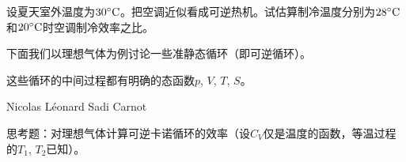 \documentclass[CJK]{beamer}
\begin{document}
\begin{frame}
\bch


设夏天室外温度为$30^\circ \mathrm{C}$。把空调近似看成可逆热机。试估算制冷温度分别为$28^\circ \mathrm{C}$和$20^\circ \mathrm{C}$时空调制冷效率之比。

\ech
\end{frame}

\begin{frame}
\bch
下面我们以理想气体为例讨论一些准静态循环（即可逆循环）。

\skipline

这些循环的中间过程都有明确的态函数$p$, $V$, $T$, $S$。
\ech
\end{frame}

\begin{frame}
\bch
{}
\ech
\end{frame}

\begin{frame}
\bch
{}
\ech
\end{frame}


\begin{frame}
\bch
{}
\ech
\end{frame}

\begin{frame}
\bch
{}
\ech
\end{frame}

\begin{frame}
\bch

\emini
{}
\bcenter
Nicolas Léonard Sadi Carnot
\ecenter
\emini
\ech
\end{frame}


\begin{frame}
\bch


\ech
\end{frame}

\begin{frame}
\bch
{}

思考题：对理想气体计算可逆卡诺循环的效率（设$C_V$仅是温度的函数，等温过程的$T_1$, $T_2$已知）。
\ech
\end{frame}
\end{document}
